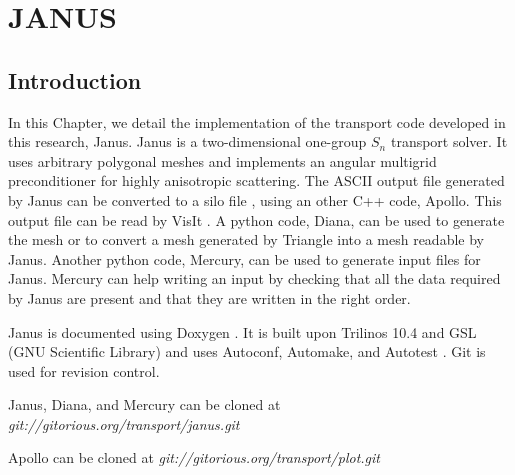 \chapter{\uppercase{Janus}}
\label{janus_chapter}
\section{Introduction}
In this Chapter, we detail the implementation of the transport code developed
in this research, Janus. Janus is a two-dimensional one-group $S_n$ transport
solver. It uses arbitrary polygonal meshes and implements an angular multigrid
preconditioner for highly anisotropic scattering. The ASCII output file generated
by Janus can be converted to a silo file \cite{silo}, using an other C++ code,
Apollo. This output file can be read by VisIt \cite{visit}. A python code, 
Diana, can be used to generate the mesh or to convert a mesh generated by Triangle
\cite{triangle} into a mesh readable by Janus. Another python code, Mercury,
can be used to generate input files for Janus. Mercury can help writing an
input by checking that all the data required by Janus are present and that
they are written in the right order. 

Janus is documented using Doxygen \cite{doxygen}. It is built upon Trilinos
10.4 \cite{trilinos} and GSL (GNU Scientific Library) \cite{gsl} and uses
Autoconf, Automake, and Autotest \cite{autoconf,automake}. Git \cite{git} 
is used for revision control. 

Janus, Diana, and Mercury can be cloned at 
\emph{\hbox{git://gitorious.org/transport/janus.git}} 

Apollo can be cloned at \emph{\hbox{git://gitorious.org/transport/plot.git}}

